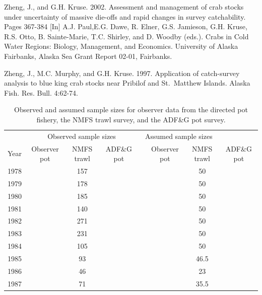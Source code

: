 \documentclass[]{article}
\begin{document}
Zheng, J., and G.H. Kruse. 2002. Assessment and management of crab
stocks under uncertainty of massive die-offs and rapid changes in survey
catchability. Pages 367-384 {[}In{]} A.J. Paul,E.G. Dawe, R. Elner, G.S.
Jamieson, G.H. Kruse, R.S. Otto, B. Sainte-Marie, T.C. Shirley, and D.
Woodby (eds.). Crabs in Cold Water Regions: Biology, Management, and
Economics. University of Alaska Fairbanks, Alaska Sea Grant Report
02-01, Fairbanks.

Zheng, J., M.C. Murphy, and G.H. Kruse. 1997. Application of
catch-survey analysis to blue king crab stocks near Pribilof and
St.~Matthew Islands. Alaska Fish. Res. Bull. 4:62-74.

\newpage

\clearpage

\begin{table}[ht]
\centering
\caption{Observed and assumed sample sizes for observer data from the directed pot fishery, the NMFS trawl survey, and the ADF\&G pot survey.} 
\label{tab:effn}
\begin{tabular}{lccccccc}
  \hline
  & \multicolumn{3}{c}{Observed sample sizes} & \multicolumn{3}{c}{Assumed sample sizes} \\
  \cline{2-4}\cline{6-8}
  Year & Observer pot & NMFS trawl & ADF\&G pot & & Observer pot & NMFS trawl & ADF\&G pot \\ 
  \hline
  1978 &              & 157        &          & &              & 50         & \\
  1979 &              & 178        &          & &              & 50         & \\
  1980 &              & 185        &          & &              & 50         & \\
  1981 &              & 140        &          & &              & 50         & \\
  1982 &              & 271        &          & &              & 50         & \\
  1983 &              & 231        &          & &              & 50         & \\
  1984 &              & 105        &          & &              & 50         & \\
  1985 &              &  93        &          & &              & 46.5       & \\
  1986 &              &  46        &          & &              & 23         & \\
  1987 &              &  71        &          & &              & 35.5       & \\

\end{tabular}
\end{table}
\end{document}
